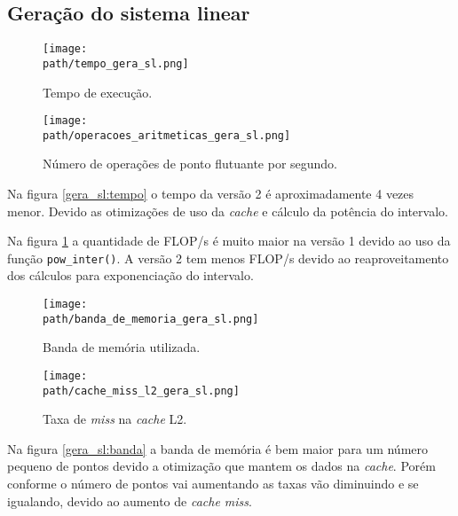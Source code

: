 \documentclass[a4paper, 11pt]{article}
\begin{document}
\subsection{Geração do sistema linear}
\begin{figure}[!h]
    \centering
    \begin{minipage}{.5\textwidth}
        \centering
        \texttt{[image: \\path/tempo\_gera\_sl.png]}
        \caption{Tempo de execução.}
        \label{gera_sl:tempo}
    \end{minipage}\hfill
    \begin{minipage}{.5\textwidth}
        \centering
        \texttt{[image: \\path/operacoes\_aritmeticas\_gera\_sl.png]}
        \caption{Número de operações de ponto flutuante por segundo.}
        \label{gera_sl:flops}
    \end{minipage}
\end{figure}

Na figura \ref{gera_sl:tempo} o tempo da versão 2 é aproximadamente 4 vezes menor. Devido as otimizações de uso da \textit{cache} e cálculo da potência do intervalo.

Na figura \ref{gera_sl:flops} a quantidade de FLOP/s é muito maior na versão 1 devido ao uso da função \texttt{pow\_inter()}. A versão 2 tem menos FLOP/s devido ao reaproveitamento dos cálculos para exponenciação do intervalo.

\begin{figure}[H]
    \centering
    \begin{minipage}{.5\textwidth}
        \centering
        \texttt{[image: \\path/banda\_de\_memoria\_gera\_sl.png]}
        \caption{Banda de memória utilizada.}
        \label{gera_sl:banda}
    \end{minipage}\hfill
    \begin{minipage}{.5\textwidth}
        \centering
        \texttt{[image: \\path/cache\_miss\_l2\_gera\_sl.png]}
        \caption{Taxa de \textit{miss} na \textit{cache} L2.}
        \label{gera_sl:cache_miss}
    \end{minipage}
\end{figure}

Na figura \ref{gera_sl:banda} a banda de memória é bem maior para um número pequeno de pontos devido a otimização que mantem os dados na \textit{cache}. Porém conforme o número de pontos vai aumentando as taxas vão diminuindo e se igualando, devido ao aumento de \textit{cache miss}.
\end{document}
